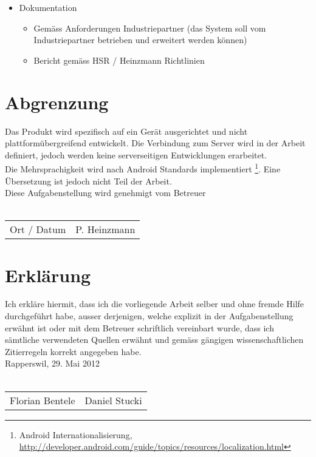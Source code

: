 \begin{itemize}
\item Dokumentation
\begin{itemize}
\item Gemäss Anforderungen Industriepartner (das System soll vom Industriepartner betrieben und erweitert werden können)
\item Bericht gemäss HSR / Heinzmann Richtlinien
\end{itemize}
\end{itemize}

\section*{Abgrenzung}
Das Produkt wird spezifisch auf ein Gerät ausgerichtet und nicht plattformübergreifend entwickelt. Die Verbindung zum Server wird in der Arbeit definiert, jedoch werden keine serverseitigen Entwicklungen erarbeitet.
\\
Die Mehrsprachigkeit wird nach Android Standards implementiert \footnote{Android Internationalisierung, \url{http://developer.android.com/guide/topics/resources/localization.html}}. Eine Übersetzung ist jedoch nicht Teil der Arbeit.
\\
Diese Aufgabenstellung wird genehmigt vom Betreuer
\\
\\

\begin{tabular}{p{3cm}p{4cm}}
\hline
Ort / Datum & P. Heinzmann
\end{tabular}

\section*{Erklärung}
Ich erkläre hiermit, dass ich die vorliegende Arbeit selber und ohne fremde Hilfe durchgeführt habe, ausser derjenigen, welche explizit in der Aufgabenstellung erwähnt ist oder mit dem Betreuer schriftlich vereinbart wurde, dass ich sämtliche verwendeten Quellen erwähnt und gemäss gängigen wissenschaftlichen Zitierregeln korrekt angegeben habe.
\\
Rapperswil, 29. Mai 2012
\\
\\

\begin{tabular}{p{5cm}p{5cm}}
\hline

Florian Bentele & Daniel Stucki
\end{tabular}
